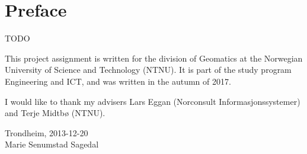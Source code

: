 \section*{Preface}

TODO

This project assignment is written for the division of Geomatics at the Norwegian University of Science and Technology (NTNU). It is part of the study program Engineering and ICT, and was written in the autumn of 2017. 

I would like to thank my advisers Lars Eggan (Norconsult Informasjonssystemer) and Terje Midtbø (NTNU).
\newline
\newline

\begin{center}
Trondheim, 2013-12-20\\[1pc]
Marie Senumstad Sagedal\\[1pc]
\end{center}
